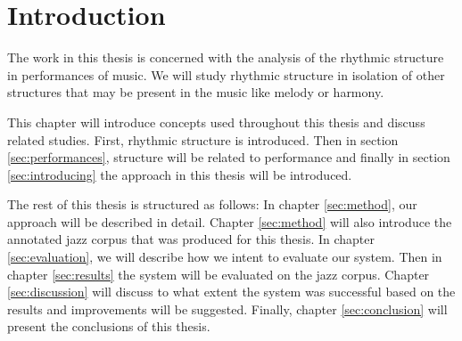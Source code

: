 \chapter{Introduction}
\label{sec:introduction}





The work in this thesis is concerned with the analysis of the rhythmic structure in performances of music. We will study rhythmic structure in isolation of other structures that may be present in the music like melody or harmony.

This chapter will introduce concepts used throughout this thesis and discuss related studies. First, rhythmic structure is introduced. Then in section \ref{sec:performances}, structure will be related to performance and finally in section \ref{sec:introducing} the approach in this thesis will be introduced.

The rest of this thesis is structured as follows: In chapter \ref{sec:method}, our approach will be described in detail. Chapter \ref{sec:method} will also introduce the annotated jazz corpus that was produced for this thesis. In chapter \ref{sec:evaluation}, we will describe how we intent to evaluate our system. Then in chapter \ref{sec:results} the system will be evaluated on the jazz corpus. Chapter \ref{sec:discussion} will discuss to what extent the system was successful based on the results and improvements will be suggested. Finally, chapter \ref{sec:conclusion} will present the conclusions of this thesis.

